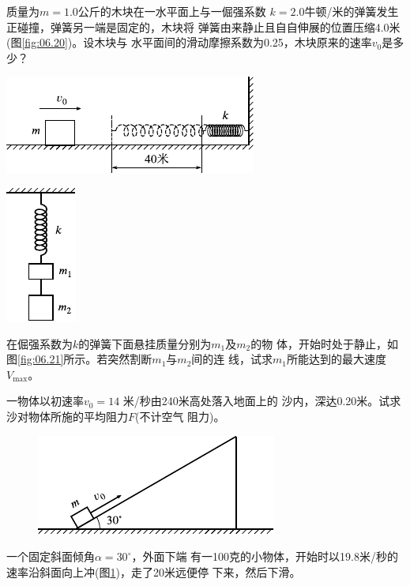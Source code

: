 \begin{exercises}
\exercise 质量为$ m = 1.0 $公斤的木块在一水平面上与一倔强系数
$ k = 2.0 $牛顿/米的弹簧发生正碰撞，弹簧另一端是固定的，木块将
弹簧由来静止且自自伸展的位置压缩4.0米(图\ref{fig:06.20})。设木块与
水平面间的滑动摩擦系数为0.25，木块原来的速率$ v _ { 0 } $是多少？
\begin{figurex}
  \begin{minipage}[b]{0.7\linewidth}
    \centering
    \includegraphics{figure/fig06.20}
    \caption{}
    \label{fig:06.20}
  \end{minipage}
  \hfill
  \begin{minipage}[b]{0.25\linewidth}
    \centering
    \includegraphics{figure/fig06.21}
    \caption{}
    \label{fig:06.21}
  \end{minipage}
\end{figurex}

\exercise 在倔强系数为$ k $的弹簧下面悬挂质量分别为$ m_1 $及$ m_2 $的物
体，开始时处于静止，如图\ref{fig:06.21}\;所示。若突然割断$ m _ { 1 } $与$ m_2 $间的连
线，试求$ m _ { 1 } $所能达到的最大速度$ V_{\max} $。

\exercise 一物体以初速率$ v _ { 0 } = 14 $ 米/秒由240米高处落入地面上的
沙内，深达0.20米。试求沙对物体所施的平均阻力$ F $(不计空气
阻力)。

\begin{figure}
  \centering
  \includegraphics{figure/fig06.22}
  \caption{}
  \label{fig:06.22}
\end{figure}
\exercise 一个固定斜面倾角$ \alpha = 30 ^ { \circ } $，外面下端
有一100克的小物体，开始时以19.8米/秒的
速率沿斜面向上冲(图\ref{fig:06.22})，走了20米远便停
下来，然后下滑。


\end{exercises}

